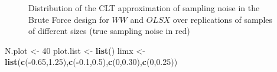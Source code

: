 \documentclass[]{book}
\newenvironment{Shaded}{\begin{snugshade}}{\end{snugshade}}
\newcommand{\KeywordTok}[1]{\textcolor[rgb]{0.13,0.29,0.53}{\textbf{#1}}}
\newcommand{\DecValTok}[1]{\textcolor[rgb]{0.00,0.00,0.81}{#1}}
\newcommand{\FloatTok}[1]{\textcolor[rgb]{0.00,0.00,0.81}{#1}}
\newcommand{\StringTok}[1]{\textcolor[rgb]{0.31,0.60,0.02}{#1}}
\newcommand{\OperatorTok}[1]{\textcolor[rgb]{0.81,0.36,0.00}{\textbf{#1}}}
\newcommand{\NormalTok}[1]{#1}
\theoremstyle{definition}
\theoremstyle{definition}
\theoremstyle{definition}
\theoremstyle{remark}
\begin{document}
\begin{figure}[htbp]

{\centering {}

}

\caption{Distribution of the CLT approximation of sampling noise in the Brute Force design for $WW$ and $OLSX$ over replications of samples of different sizes (true sampling noise in red)}\label{fig:sampnoisewwBFCLTall}
\end{figure}

\begin{Shaded}
\begin{Highlighting}[]
\NormalTok{N.plot <-}\StringTok{ }\DecValTok{40}
\NormalTok{plot.list <-}\StringTok{ }\KeywordTok{list}\NormalTok{()}
\NormalTok{limx <-}\StringTok{ }\KeywordTok{list}\NormalTok{(}\KeywordTok{c}\NormalTok{(}\OperatorTok{-}\FloatTok{0.65}\NormalTok{,}\FloatTok{1.25}\NormalTok{),}\KeywordTok{c}\NormalTok{(}\OperatorTok{-}\FloatTok{0.1}\NormalTok{,}\FloatTok{0.5}\NormalTok{),}\KeywordTok{c}\NormalTok{(}\DecValTok{0}\NormalTok{,}\FloatTok{0.30}\NormalTok{),}\KeywordTok{c}\NormalTok{(}\DecValTok{0}\NormalTok{,}\FloatTok{0.25}\NormalTok{))}


\end{Highlighting}
\end{Shaded}
\end{document}
